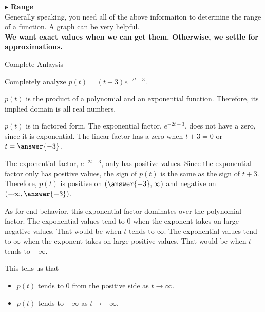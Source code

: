 \documentclass{ximera}
\begin{document}
$\blacktriangleright$ \textbf{\textcolor{red!10!blue!90!}{Range}}   \\
Generally speaking, you need all of the above informaiton to determine the range of a function.  A graph can be very helpful. \\




\textbf{\textcolor{red!70!black}{We want exact values when we can get them.  Otherwise, we settle for approximations.}}









\begin{example} Complete Anlaysis

Completely analyze $p(t) = (t+3)e^{-2t-3}$.

\begin{explanation}


$p(t)$ is the product of a polynomial and an exponential function. Therefore, its implied domain is all real numbers.

$p(t)$ is in factored form.  The exponential factor, $e^{-2t-3}$, does not have a zero, since it is exponential.  The linear factor has a zero when $t+3=0$ or $t=\answer{-3}$.  

The exponential factor, $e^{-2t-3}$, only has positive values.   Since the exponential factor only has positive values, the sign of $p(t)$ is the same as the sign of $t+3$.  Therefore, $p(t)$ is positive on $\left( \answer{-3}, \infty \right)$ and negative on $\left( -\infty, \answer{-3} \right)$.  





As for end-behavior, this exponential factor dominates over the polynomial factor.  The exponential values tend to $0$ when the exponent takes on large negative values.  That would be when $t$ tends to $\infty$. The exponential values tend to $\infty$ when the exponent takes on large positive values.  That would be when $t$ tends to $-\infty$.  




This tells us that 

\begin{itemize}
\item $p(t)$ tends to $0$ from the positive side as $t \to \infty$.
\item $p(t)$ tends to $-\infty$ as $t \to -\infty$.
\end{itemize}




\end{explanation}
\end{example}
\end{document}

